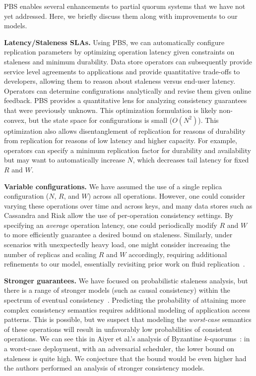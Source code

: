 \documentclass{vldb}
\begin{document}
PBS enables several enhancements to partial quorum systems that we
have not yet addressed.  Here, we briefly discuss them along with
improvements to our models.

\textbf{Latency/Staleness SLAs.} Using PBS, we can automatically
configure replication parameters by optimizing operation latency given
constraints on staleness and minimum durability.  Data store operators
can subsequently provide service level agreements to applications and
provide quantitative trade-offs to developers, allowing them to reason
about staleness versus end-user latency.  Operators can determine
configurations analytically and revise them given online feedback.
PBS provides a quantitative lens for analyzing consistency guarantees
that were previously unknown.  This optimization formulation is likely
non-convex, but the state space for configurations is small
($O(N^2)$).  This optimization also allows disentanglement of
replication for reasons of durability from replication for reasons of
low latency and higher capacity.  For example, operators can specify a
minimum replication factor for durability and availability but may
want to automatically increase $N$, which decreases tail latency for
fixed $R$ and $W$.

\textbf{Variable configurations.} We have assumed the use of a single
replica configuration ($N$, $R$, and $W$) across all operations.
However, one could consider varying these operations over time and
across keys, and many data stores such as Cassandra and Riak allow the use of
per-operation consistency settings.  By specifying an \textit{average}
operation latency, one could periodically modify $R$ and $W$ to more
efficiently guarantee a desired bound on staleness.  Similarly, under
scenarios with unexpectedly heavy load, one might consider increasing
the number of replicas and scaling $R$ and $W$ accordingly, requiring
additional refinements to our model, essentially revisiting prior work
on fluid replication~\cite{fluidreplication}.

\textbf{Stronger guarantees.} We have focused on probabilistic
staleness analysis, but there is a range of stronger models (such as
causal consistency) within the spectrum of eventual
consistency~\cite{vogels-defs}.  Predicting the probability of
attaining more complex consistency semantics requires additional
modeling of application access patterns.  This is possible, but we
suspect that modeling the \textit{worst-case} semantics of these
operations will result in unfavorably low probabilities of consistent
operations.  We can see this in Aiyer et al.'s analysis of Byzantine
$k$-quorums~\cite{multi-k-quorum}: in a worst-case deployment, with an
adversarial scheduler, the lower bound on staleness is quite high.  We
conjecture that the bound would be even higher had the authors
performed an analysis of stronger consistency models.
\end{document}
